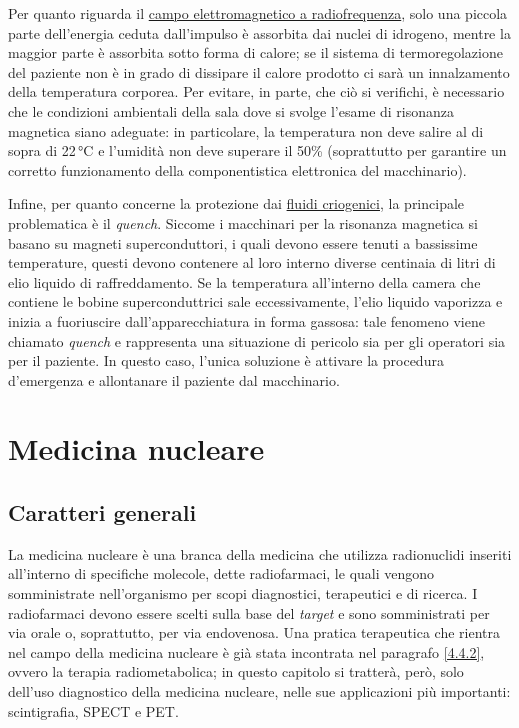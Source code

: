 \documentclass{report}
\numberwithin{equation}{section}
\numberwithin{figure}{section}
\begin{document}
Per quanto riguarda il \underline{campo elettromagnetico a radiofrequenza}, solo una piccola parte dell'energia ceduta dall'impulso è assorbita dai nuclei di idrogeno, mentre la maggior parte è assorbita sotto forma di calore; se il sistema di termoregolazione del paziente non è in grado di dissipare il calore prodotto ci sarà un innalzamento della temperatura corporea. Per evitare, in parte, che ciò si verifichi, è necessario che le condizioni ambientali della sala dove si svolge l'esame di risonanza magnetica siano adeguate: in particolare, la temperatura non deve salire al di sopra di 22\,°C e l’umidità non deve superare il 50\% (soprattutto per garantire un corretto funzionamento della componentistica elettronica del macchinario).

Infine, per quanto concerne la protezione dai \underline{fluidi criogenici}, la principale problematica è il \textit{quench}. Siccome i macchinari per la risonanza magnetica si basano su magneti superconduttori, i quali devono essere tenuti a bassissime temperature, questi devono contenere al loro interno diverse centinaia di litri di elio liquido di raffreddamento. Se la temperatura all'interno della camera che contiene le bobine superconduttrici sale eccessivamente, l'elio liquido vaporizza e inizia a fuoriuscire dall'apparecchiatura in forma gassosa: tale fenomeno viene chiamato \textit{quench} e rappresenta una situazione di pericolo sia per gli operatori sia per il paziente. In questo caso, l'unica soluzione è attivare la procedura d'emergenza e allontanare il paziente dal macchinario.

\chapter{Medicina nucleare}

\section{Caratteri generali}
La medicina nucleare è una branca della medicina che utilizza radionuclidi inseriti all'interno di specifiche molecole, dette radiofarmaci, le quali vengono somministrate nell'organismo per scopi diagnostici, terapeutici e di ricerca. I radiofarmaci devono essere scelti sulla base del \textit{target} e sono somministrati per via orale o, soprattutto, per via endovenosa. Una pratica terapeutica che rientra nel campo della medicina nucleare è già stata incontrata nel paragrafo \ref{4.4.2}, ovvero la terapia radiometabolica; in questo capitolo si tratterà, però, solo dell'uso diagnostico della medicina nucleare, nelle sue applicazioni più importanti: scintigrafia, SPECT e PET.
\end{document}
